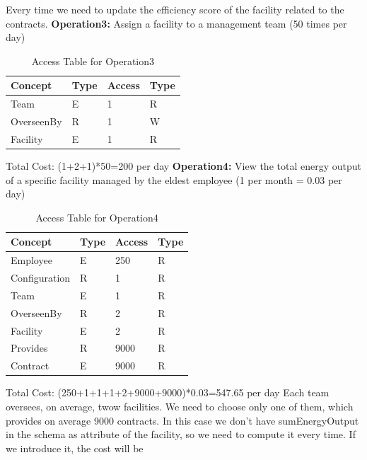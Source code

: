 \noindent Every time we need to update the efficiency score of the facility related to the contracts.
\newline
\noindent \textbf{Operation3:} Assign a facility to a management team (50 times per day)\\
\begin{table}[H]
    \renewcommand{\arraystretch}{1.3} %
    \begin{tabularx}{\textwidth}{|X|X|X|X|}
    \hline
    \textbf{Concept}& \textbf{Type}  & \textbf{Access}    & \textbf{Type}     \\ \hline
    Team & E & 1 & R \\ \hline
    OverseenBy & R & 1 & W \\ \hline
    Facility & E & 1 & R \\ \hline
    \end{tabularx}
    \caption{Access Table for Operation3}
\end{table}
\noindent Total Cost: (1+2+1)*50=200 per day
\newline
\noindent \textbf{Operation4:} View the total energy output of a specific facility managed by the eldest employee (1 per month = 0.03 per day)\\
\begin{table}[H]
    \renewcommand{\arraystretch}{1.3} %
    \begin{tabularx}{\textwidth}{|X|X|X|X|}
    \hline
    \textbf{Concept}& \textbf{Type}  & \textbf{Access}    & \textbf{Type}     \\ \hline
    Employee & E & 250 & R \\ \hline
    Configuration & R & 1 & R \\ \hline
    Team & E & 1 & R \\ \hline
    OverseenBy & R & 2 & R \\ \hline
    Facility & E & 2 & R \\ \hline
    Provides & R & 9000 & R \\ \hline
    Contract & E & 9000 & R \\ \hline
    \end{tabularx}
    \caption{Access Table for Operation4}
\end{table}
\noindent Total Cost: (250+1+1+1+2+9000+9000)*0.03=547.65 per day
\newline
\noindent Each team oversees, on average, twow facilities. We need to choose only one of them, which provides on average 9000 contracts.
In this case we don't have sumEnergyOutput in the schema as attribute of the facility, so we need to compute it every time. If we introduce it, the cost will be
